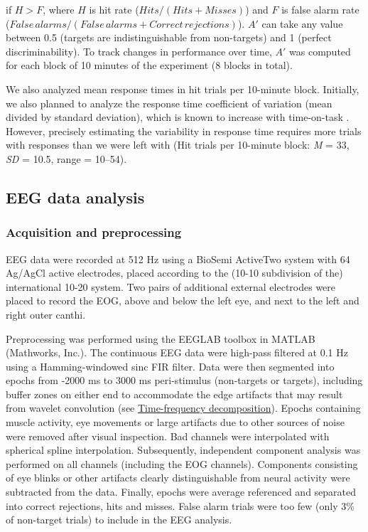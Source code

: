\documentclass[11pt,]{memoir}
\begin{document}
\noindent if \(H > F\), where \(H\) is hit rate (\(Hits / (Hits + Misses)\)) and \(F\) is false alarm rate (\(False\, alarms / (False\, alarms + Correct\, rejections)\)). \(A'\) can take any value between 0.5 (targets are indistinguishable from non-targets) and 1 (perfect discriminability). To track changes in performance over time, \(A'\) was computed for each block of 10 minutes of the experiment (8 blocks in total).

We also analyzed mean response times in hit trials per 10-minute block. Initially, we also planned to analyze the response time coefficient of variation (mean divided by standard deviation), which is known to increase with time-on-task \autocites{Esterman2013}{VanDenBrink2016}. However, precisely estimating the variability in response time requires more trials with responses than we were left with (Hit trials per 10-minute block: \emph{M} = 33, \emph{SD} = 10.5, range = 10--54).

\hypertarget{eeg-data-analysis}{%
\subsection{EEG data analysis}\label{eeg-data-analysis}}

\hypertarget{acquisition-and-preprocessing}{%
\subsubsection{Acquisition and preprocessing}\label{acquisition-and-preprocessing}}

EEG data were recorded at 512 Hz using a BioSemi ActiveTwo system with 64 Ag/AgCl active electrodes, placed according to the (10-10 subdivision of the) international 10-20 system. Two pairs of additional external electrodes were placed to record the EOG, above and below the left eye, and next to the left and right outer canthi.

Preprocessing was performed using the EEGLAB toolbox \autocite{Delorme2004} in MATLAB (Mathworks, Inc.). The continuous EEG data were high-pass filtered at 0.1 Hz using a Hamming-windowed sinc FIR filter. Data were then segmented into epochs from -2000 ms to 3000 ms peri-stimulus (non-targets or targets), including buffer zones on either end to accommodate the edge artifacts that may result from wavelet convolution (see \protect\hyperlink{time-frequency-decomposition}{Time-frequency decomposition}). Epochs containing muscle activity, eye movements or large artifacts due to other sources of noise were removed after visual inspection. Bad channels were interpolated with spherical spline interpolation. Subsequently, independent component analysis was performed on all channels (including the EOG channels). Components consisting of eye blinks or other artifacts clearly distinguishable from neural activity were subtracted from the data. Finally, epochs were average referenced and separated into correct rejections, hits and misses. False alarm trials were too few (only 3\% of non-target trials) to include in the EEG analysis.
\end{document}

